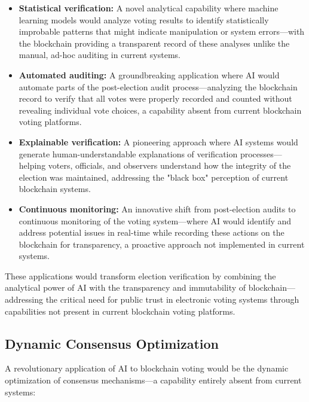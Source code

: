 \documentclass[conference]{IEEEtran}
\begin{document}
\begin{itemize}
    \item \textbf{Statistical verification:} A novel analytical capability where machine learning models would analyze voting results to identify statistically improbable patterns that might indicate manipulation or system errors—with the blockchain providing a transparent record of these analyses unlike the manual, ad-hoc auditing in current systems.
    
    \item \textbf{Automated auditing:} A groundbreaking application where AI would automate parts of the post-election audit process—analyzing the blockchain record to verify that all votes were properly recorded and counted without revealing individual vote choices, a capability absent from current blockchain voting platforms.
    
    \item \textbf{Explainable verification:} A pioneering approach where AI systems would generate human-understandable explanations of verification processes—helping voters, officials, and observers understand how the integrity of the election was maintained, addressing the "black box" perception of current blockchain systems.
    
    \item \textbf{Continuous monitoring:} An innovative shift from post-election audits to continuous monitoring of the voting system—where AI would identify and address potential issues in real-time while recording these actions on the blockchain for transparency, a proactive approach not implemented in current systems.
\end{itemize}

These applications would transform election verification by combining the analytical power of AI with the transparency and immutability of blockchain—addressing the critical need for public trust in electronic voting systems through capabilities not present in current blockchain voting platforms.

\subsection{Dynamic Consensus Optimization}
A revolutionary application of AI to blockchain voting would be the dynamic optimization of consensus mechanisms—a capability entirely absent from current systems:
\end{document}

